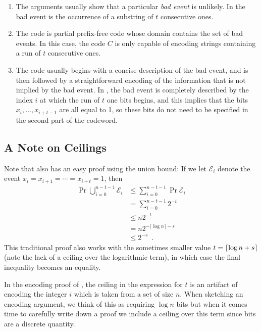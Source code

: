 \documentclass{patmorin}
\begin{document}
\begin{enumerate}
\item The arguments usually show that a particular \emph{bad event} is
  unlikely. In  the bad event is the occurrence of a
  substring of $t$ consecutive ones.

\item The code is partial prefix-free code whose domain contains the
  set of bad events. In this case, the code $C$ is only capable of
  encoding strings containing a run of $t$ consecutive ones.

\item The code usually begins with a concise description of the bad
  event, and is then followed by a straightforward encoding of the
  information that is not implied by the bad event. In
  , the bad event is completely described by the index
  $i$ at which the run of $t$ one bits begins, and this implies that
  the bits $x_i,\ldots,x_{i+t-1}$ are all equal to 1, so these bits do
  not need to be specified in the second part of the codeword.
\end{enumerate}

\subsection{A Note on Ceilings}

Note that  also has an easy proof using the union
bound: If we let $\mathcal{E}_i$ denote the event
$x_i=x_{i+1}=\cdots=x_{i+t}=1$, then
\begin{align*}
  \Pr \bigcup_{i=0}^{n-t-1} \mathcal{E}_i
  & \le \sum_{i=0}^{n-t-1} \Pr\mathcal{E}_i  \tag{using the union bound}\\
  & = \sum_{i=0}^{n-t-1} 2^{-t}  \tag{using the independence of the $x_i$'s}\\
  & \le n2^{-t}  \tag{the sum has $n-t\le n$ identical terms}\\
  & = n2^{-\lceil\log n\rceil-s}  \tag{from the definition of $t$}\\
  & \le 2^{-s} \enspace .
\end{align*}
This traditional proof also works with the sometimes smaller value
$t={\lceil \log n+s \rceil}$ (note the lack of a ceiling over the logarithmic
term), in which case the final inequality becomes an equality.

In the encoding proof of , the ceiling in the
expression for $t$ is an artifact of encoding the integer $i$ which is
taken from a set of size $n$. When sketching an encoding argument, we
think of this as requiring $\log n$ bits but when it comes time to
carefully write down a proof we include a ceiling over this term since
bits are a discrete quantity.
\end{document}
